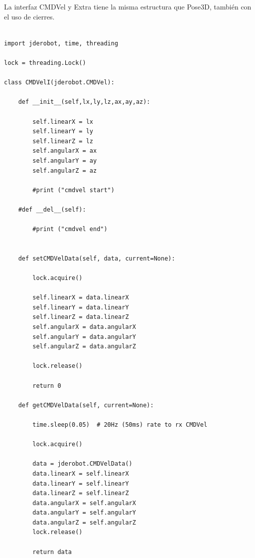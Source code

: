 La interfaz CMDVel y Extra tiene la misma estructura que Pose3D, también con el uso de cierres.

\begin{lstlisting}[frame=single]

import jderobot, time, threading

lock = threading.Lock()

class CMDVelI(jderobot.CMDVel):

    def __init__(self,lx,ly,lz,ax,ay,az):

        self.linearX = lx
        self.linearY = ly
        self.linearZ = lz
        self.angularX = ax
        self.angularY = ay
        self.angularZ = az

        #print ("cmdvel start")

    #def __del__(self):

        #print ("cmdvel end")


    def setCMDVelData(self, data, current=None):

        lock.acquire()

        self.linearX = data.linearX
        self.linearY = data.linearY
        self.linearZ = data.linearZ
        self.angularX = data.angularX
        self.angularY = data.angularY
        self.angularZ = data.angularZ

        lock.release()

        return 0

    def getCMDVelData(self, current=None):

        time.sleep(0.05)  # 20Hz (50ms) rate to rx CMDVel

        lock.acquire()

        data = jderobot.CMDVelData()
        data.linearX = self.linearX
        data.linearY = self.linearY
        data.linearZ = self.linearZ
        data.angularX = self.angularX
        data.angularY = self.angularY
        data.angularZ = self.angularZ
        lock.release()

        return data
        
\end{lstlisting} 

